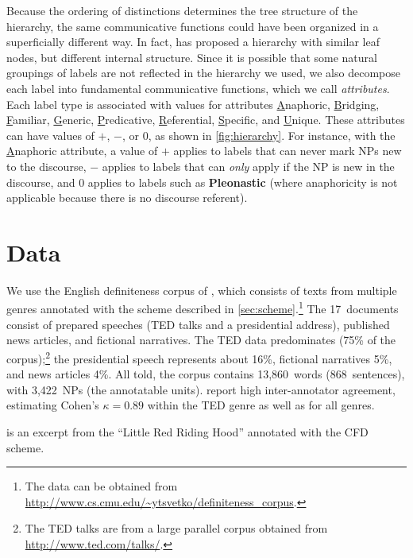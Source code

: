 \documentclass[11pt,letterpaper]{article}
\begin{document}
Because the ordering of distinctions determines the tree structure of the hierarchy, 
the same communicative functions could have been organized in a superficially different way.
In fact, \citet{komen-13} has proposed a hierarchy with similar leaf nodes, but different internal structure. 
Since it is possible that some natural groupings of labels are not reflected in the hierarchy we used, 
we also decompose each label into fundamental communicative functions, which we call \emph{attributes}. 
Each label type is associated with values for attributes  
\uline{A}naphoric, \uline{B}ridging, \uline{F}amiliar, \uline{G}eneric, \uline{P}redicative, \uline{R}eferential, \uline{S}pecific, and \uline{U}nique.
These attributes can have values of $+$, $-$, or $0$, as shown in \cref{fig:hierarchy}. 
For instance, with the \uline{A}naphoric attribute, a value of $+$ applies to labels that can never mark NPs new to the discourse, $-$ applies to labels that can {\em only} apply if the NP is new in the discourse,  
and $0$ applies to labels such as {\bf Pleonastic} (where anaphoricity is not applicable because there is no discourse referent). 



\section{Data}\label{sec:data}

We use the English definiteness corpus of \citet{bhatia14}, 
which consists of texts from multiple genres annotated with the scheme described in \cref{sec:scheme}.\footnote{The data can be obtained from \url{http://www.cs.cmu.edu/~ytsvetko/definiteness_corpus}.} 
The 17~documents consist of prepared speeches (TED talks and a presidential address), 
published news articles, and fictional narratives. 
The TED data predominates (75\% of the corpus);\footnote{The TED talks are from a large parallel corpus obtained from \url{http://www.ted.com/talks/}.} 
the presidential speech represents about 16\%, fictional narratives 5\%, and news articles 4\%. 
All told, the corpus contains 13,860~words (868~sentences), with 3,422~NPs (the annotatable units). 
\citet{bhatia14} report high inter-annotator agreement, estimating Cohen's $\kappa = 0.89$ within the TED genre 
as well as for all genres.  

 is an excerpt from the ``Little Red Riding Hood'' annotated with the CFD scheme.
\end{document}
